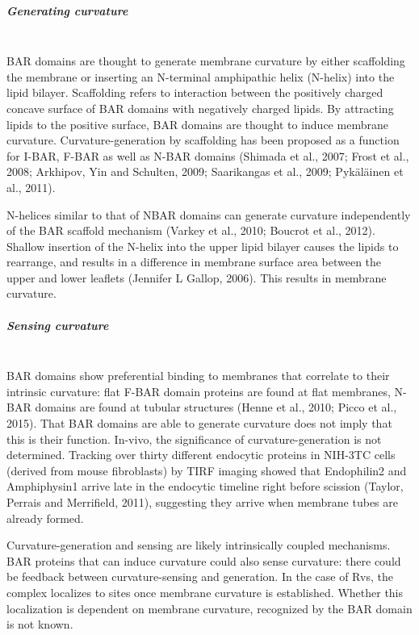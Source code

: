 	\vspace{5mm}
			
				\subparagraph{Generating curvature }
				\mbox{}\\
BAR domains are thought to generate membrane curvature by either scaffolding the membrane or inserting an N-terminal amphipathic helix (N-helix) into the lipid bilayer. 
Scaffolding refers to interaction between the positively charged concave surface of BAR domains with negatively charged lipids. By attracting lipids to the positive surface, BAR domains are thought to induce membrane curvature. Curvature-generation by scaffolding has been proposed as a function for I-BAR, F-BAR as well as N-BAR domains (Shimada et al., 2007; Frost et al., 2008; Arkhipov, Yin and Schulten, 2009; Saarikangas et al., 2009; Pykäläinen et al., 2011). 
	\vspace{5mm}
	
N-helices similar to that of NBAR domains can generate curvature independently of the BAR scaffold mechanism (Varkey et al., 2010; Boucrot et al., 2012). Shallow insertion of the N-helix into the upper lipid bilayer causes the lipids to rearrange, and results in a difference in membrane surface area between the upper and lower leaflets (Jennifer L Gallop, 2006). This results in membrane curvature. 


	
	\vspace{5mm}
	
				\subparagraph{Sensing curvature }
								\mbox{}\\
BAR domains show preferential binding to membranes that correlate to their intrinsic curvature: flat F-BAR domain proteins are found at flat membranes, N-BAR domains are found at tubular structures (Henne et al., 2010; Picco et al., 2015). That BAR domains are able to generate curvature does not imply that this is their function. In-vivo, the significance of curvature-generation is not determined. Tracking over thirty different endocytic proteins in NIH-3TC cells (derived from mouse fibroblasts) by TIRF imaging showed that Endophilin2 and Amphiphysin1 arrive late in the endocytic timeline right before scission (Taylor, Perrais and Merrifield, 2011), suggesting they arrive when membrane tubes are already formed. 


	\vspace{5mm}
Curvature-generation and sensing are likely intrinsically coupled mechanisms. BAR proteins that can induce curvature could also sense curvature: there could be feedback between curvature-sensing and generation. In the case of Rvs, the complex localizes to sites once membrane curvature is established. Whether this localization is dependent on membrane curvature, recognized by the BAR domain is not known. 


